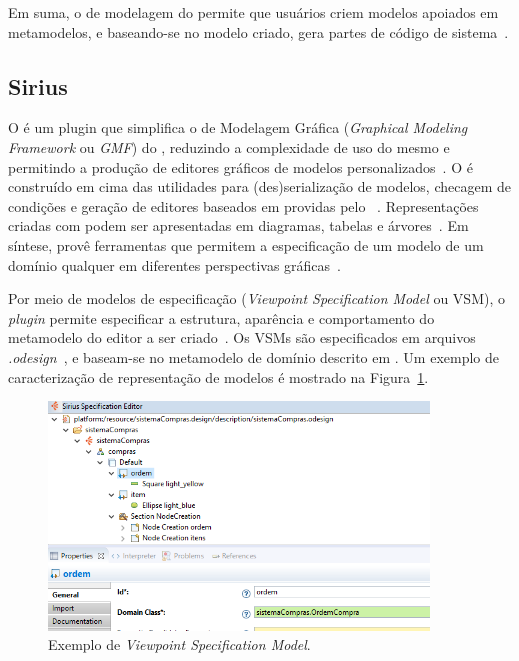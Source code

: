 Em suma, o \framework de modelagem do \eclipse permite que usuários criem modelos apoiados em metamodelos, e baseando-se no modelo criado, gera partes de código de sistema~\cite{vujovic2014comparative}.


\subsection{Sirius}

O \sirius é um plugin que simplifica o \framework de Modelagem Gráfica (\textit{Graphical Modeling Framework} ou \textit{GMF}) do \eclipse, reduzindo a complexidade de uso do mesmo e permitindo a produção de editores gráficos de modelos personalizados~\cite{viyovic2014sirius}. O \sirius é construído em cima das utilidades para (des)serialização de modelos, checagem de condições e geração de editores baseados em \ecore providas pelo \eclipse~\cite{budinsky2004eclipse}. Representações criadas com \sirius podem ser apresentadas em diagramas, tabelas e árvores~\cite{viyovic2014sirius}. Em síntese, \sirius provê ferramentas que permitem a especificação de um modelo de um domínio qualquer em diferentes perspectivas gráficas~\cite{vujovic2014comparative}.

Por meio de modelos de especificação (\textit{Viewpoint Specification Model} ou VSM), o \textit{plugin} permite especificar a estrutura, aparência e comportamento do metamodelo do editor a ser criado~\cite{viyovic2014sirius}. Os VSMs são especificados em arquivos \textit{.odesign}~\cite{viyovic2014sirius}, e baseam-se no metamodelo de domínio descrito em \ecore. Um exemplo de caracterização de representação de modelos é mostrado na Figura~\ref{exemplo-sirius}.

\begin{figure}
	\centering
	\includegraphics[width=0.9\textwidth]{figuras/exemplos-emf/exemplo-sirius-vsm.png}
	\caption{Exemplo de \textit{Viewpoint Specification Model}.}
	\label{exemplo-sirius}
\end{figure}

